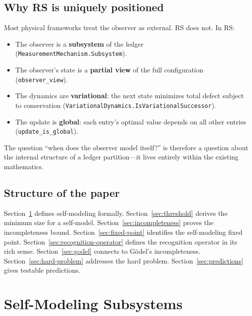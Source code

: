 \documentclass[11pt,a4paper]{article}
\theoremstyle{plain}
\theoremstyle{definition}
\theoremstyle{remark}
\begin{document}
\subsection{Why RS is uniquely positioned}

Most physical frameworks treat the observer as external.  RS does not.
In RS:
\begin{itemize}[nosep]
\item The observer is a \textbf{subsystem} of the ledger
  (\texttt{MeasurementMechanism.Subsystem}).
\item The observer's state is a \textbf{partial view} of the full
  configuration (\texttt{observer\_view}).
\item The dynamics are \textbf{variational}: the next state minimizes
  total defect subject to conservation
  (\texttt{VariationalDynamics.IsVariationalSuccessor}).
\item The update is \textbf{global}: each entry's optimal value depends
  on all other entries (\texttt{update\_is\_global}).
\end{itemize}

The question ``when does the observer model itself?'' is therefore a
question about the internal structure of a ledger partition---it lives
entirely within the existing mathematics.

\subsection{Structure of the paper}

Section~\ref{sec:self-model} defines self-modeling formally.
Section~\ref{sec:threshold} derives the minimum size for a self-model.
Section~\ref{sec:incompleteness} proves the incompleteness bound.
Section~\ref{sec:fixed-point} identifies the self-modeling fixed point.
Section~\ref{sec:recognition-operator} defines the recognition operator
in its rich sense.
Section~\ref{sec:godel} connects to G\"odel's incompleteness.
Section~\ref{sec:hard-problem} addresses the hard problem.
Section~\ref{sec:predictions} gives testable predictions.

\section{Self-Modeling Subsystems}
\label{sec:self-model}
\end{document}
